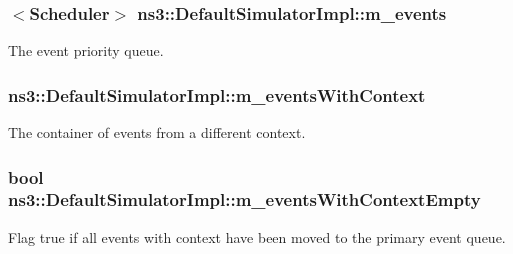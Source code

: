 \subsubsection[{\texorpdfstring{m\+\_\+events}{m_events}}]{$<${\bf Scheduler}$>$ ns3\+::\+Default\+Simulator\+Impl\+::m\+\_\+events\hspace{0.3cm}{\ttfamily [private]}}\hypertarget{classns3_1_1DefaultSimulatorImpl_a68703f6bd4940f4845dbaa49bb679d16}{}\label{classns3_1_1DefaultSimulatorImpl_a68703f6bd4940f4845dbaa49bb679d16}
The event priority queue. 
\subsubsection[{\texorpdfstring{m\+\_\+events\+With\+Context}{m_eventsWithContext}}]{ ns3\+::\+Default\+Simulator\+Impl\+::m\+\_\+events\+With\+Context\hspace{0.3cm}{\ttfamily [private]}}\hypertarget{classns3_1_1DefaultSimulatorImpl_afef52c1fc06adf9ca1afa762f0a0934d}{}\label{classns3_1_1DefaultSimulatorImpl_afef52c1fc06adf9ca1afa762f0a0934d}
The container of events from a different context. 
\subsubsection[{\texorpdfstring{m\+\_\+events\+With\+Context\+Empty}{m_eventsWithContextEmpty}}]{\setlength{\rightskip}{0pt plus 5cm}bool ns3\+::\+Default\+Simulator\+Impl\+::m\+\_\+events\+With\+Context\+Empty\hspace{0.3cm}{\ttfamily [private]}}\hypertarget{classns3_1_1DefaultSimulatorImpl_a12b039f82d7326a0a0bcd38dd09c5d2a}{}\label{classns3_1_1DefaultSimulatorImpl_a12b039f82d7326a0a0bcd38dd09c5d2a}
Flag {\ttfamily true} if all events with context have been moved to the primary event queue. 
